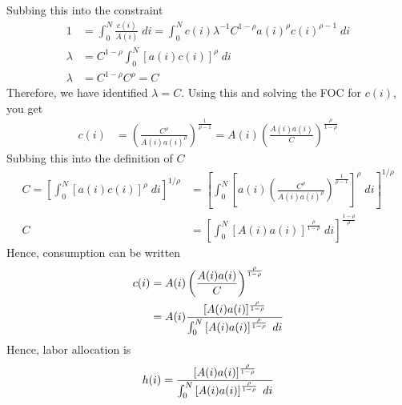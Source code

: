 \documentclass[12pt]{article}
\theoremstyle{plain}
\theoremstyle{definition}
\theoremstyle{remark}
\newcommand{\intzN}{\int_0^N}
\begin{document}
Subbing this into the constraint
\begin{align*}
  1&=
  \intzN \frac{c(i)}{A(i)} \; di
  =
  \intzN
    c(i)
    \lambda^{-1} C^{1-\rho} a(i)^\rho c(i)^{\rho-1}
    \; di \\
  \lambda &=
  C^{1-\rho}
  \intzN
    [a(i)c(i)]^{\rho}
    \; di \\
  \lambda &= C^{1-\rho} C^\rho = C
\end{align*}
Therefore, we have identified $\lambda = C$. Using this and solving the
FOC for $c(i)$, you get
\begin{align*}
  c(i)
  &=
  \left(
  \frac{C^{\rho}}{A(i)a(i)^\rho}
  \right)^{\frac{1}{\rho-1}}
  =
  A(i)
  \left(\frac{A(i)a(i)}{C}\right)^{\frac{\rho}{1-\rho}}
\end{align*}
Subbing this into the definition of $C$
\begin{align*}
  C
  = \left[ \int_0^N [a(i)c(i)]^\rho \; di \right]^{1/\rho}
  &=
  \left[ \int_0^N
    \left[a(i)
    \left(
    \frac{C^{\rho}}{A(i)a(i)^\rho}
    \right)^{\frac{1}{\rho-1}}
    \right]^\rho \; di \right]^{1/\rho} \\
  C
  &=
  \left[ \int_0^N
    \left[
    A(i)a(i)
    \right]^{\frac{\rho}{1-\rho}}
    \; di \right]^{\frac{1-\rho}{\rho}}
\end{align*}
Hence, consumption can be written
\begin{align*}
  c(i)
  &=
  A(i)
  \left(\frac{A(i)a(i)}{C}\right)^{\frac{\rho}{1-\rho}} \\
  &=
  A(i)
  \frac{[A(i)a(i)]^{\frac{\rho}{1-\rho}}}{%
    \int_0^N \left[ A(i)a(i) \right]^{\frac{\rho}{1-\rho}} \; di
  }
\end{align*}
Hence, labor allocation is
\begin{align*}
  h(i) =
  \frac{[A(i)a(i)]^{\frac{\rho}{1-\rho}}}{%
    \int_0^N \left[ A(i)a(i) \right]^{\frac{\rho}{1-\rho}} \; di
  }
\end{align*}





\end{document}

